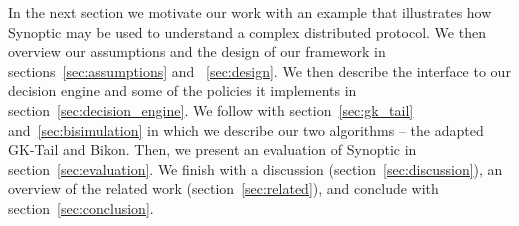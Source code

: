 In the next section we motivate our work with an example that
illustrates how Synoptic may be used to understand a complex
distributed protocol. We then overview our assumptions and the design
of our framework in sections~\ref{sec:assumptions} and
~\ref{sec:design}. We then describe the interface to our decision
engine and some of the policies it implements in
section~\ref{sec:decision_engine}.  We follow with
section~\ref{sec:gk_tail} and~\ref{sec:bisimulation} in which we
describe our two algorithms -- the adapted GK-Tail and Bikon. Then, we
present an evaluation of Synoptic in section~\ref{sec:evaluation}. We
finish with a discussion (section~\ref{sec:discussion}), an overview
of the related work (section~\ref{sec:related}), and conclude with
section~\ref{sec:conclusion}.
